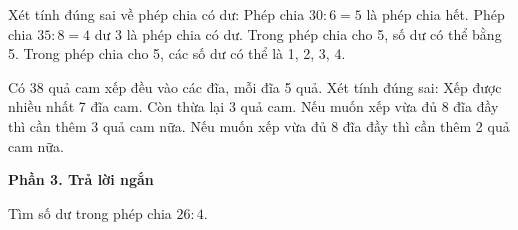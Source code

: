 \begin{ex} %
Xét tính đúng sai về phép chia có dư:
\choiceTF
{\True Phép chia $30 : 6 = 5$ là phép chia hết.}
{\True Phép chia $35 : 8 = 4$ dư $3$ là phép chia có dư.}
{Trong phép chia cho 5, số dư có thể bằng 5.}
{\True Trong phép chia cho 5, các số dư có thể là 1, 2, 3, 4.}
\end{ex}

\begin{ex} %
Có 38 quả cam xếp đều vào các đĩa, mỗi đĩa 5 quả. Xét tính đúng sai:
\choiceTF
{\True Xếp được nhiều nhất 7 đĩa cam.}
{\True Còn thừa lại 3 quả cam.}
{Nếu muốn xếp vừa đủ 8 đĩa đầy thì cần thêm 3 quả cam nữa.}
{\True Nếu muốn xếp vừa đủ 8 đĩa đầy thì cần thêm 2 quả cam nữa.}
\end{ex}

\textbf{Phần 3. Trả lời ngắn}

\begin{ex} %
Tìm số dư trong phép chia $26 : 4$.
\end{ex}

